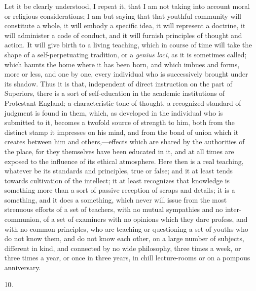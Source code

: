 Let it be clearly understood, I repeat it, that I am not taking
into account moral or religious considerations; I am but saying that
that youthful community will constitute a whole, it will embody a
specific idea, it will represent a doctrine, it will administer a code
of conduct, and it will furnish principles of thought and action. It
will give birth to a living teaching, which in course of time will
take the shape of a self-perpetuating tradition, or a \emph{genius loci},
as it is sometimes called; which haunts the home where it has been
born, and which imbues and forms, more or less, and one by one, every
individual who is successively brought under its shadow. Thus it is
that, independent of direct instruction on the part of Superiors,
there is a sort of self-education in the academic institutions of
Protestant England; a characteristic tone of thought, a recognized
standard of judgment is found in them, which, as developed in the
individual who is submitted to it, becomes a twofold source of
strength to him, both from the distinct stamp it impresses on his
mind, and from the bond of union which it creates between him and
others,—effects which are shared by the authorities of the place,
for they themselves have been educated in it, and at all times are
exposed to the influence of its ethical atmosphere. Here then is a
real teaching, whatever be its standards and principles, true or
false; and it at least tends towards cultivation of the intellect; it
at least recognizes that knowledge is something more than a sort of
passive reception of scraps and details; it is a something, and
it does a something, which never will issue from the most strenuous
efforts of a set of teachers, with no mutual sympathies and no
inter-communion, of a set of examiners with no opinions which they
dare profess, and with no common principles, who are teaching or
questioning a set of youths who do not know them, and do not know each
other, on a large number of subjects, different in kind, and connected
by no wide philosophy, three times a week, or three times a year, or
once in three years, in chill lecture-rooms or on a pompous
anniversary.

10.

